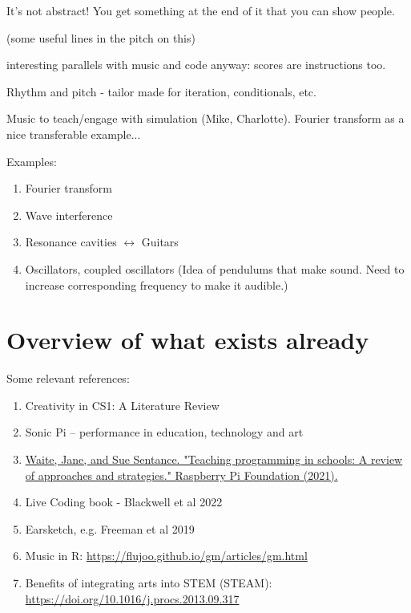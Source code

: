 It's not abstract! You get something at the end of it that you can show people.

(some useful lines in the pitch on this)

interesting parallels with music and code anyway: scores are instructions too.

Rhythm and pitch - tailor made for iteration, conditionals, etc.

Music to teach/engage with simulation (Mike, Charlotte). Fourier transform as a nice transferable example...

Examples:
\begin{enumerate}
    \item Fourier transform
    \item Wave interference
    \item Resonance cavities $\leftrightarrow{}$ Guitars
    \item Oscillators, coupled oscillators (Idea of pendulums that make sound. Need to increase corresponding frequency to make it audible.)
\end{enumerate}


\section{Overview of what exists already} \label{sec:literature}

Some relevant references:
\begin{enumerate}
\item Creativity in CS1: A Literature Review \cite{Sharmin2021}
\item Sonic Pi – performance in education, technology and art \cite{Aaron2016}
\item \href{https://www.raspberrypi.org/app/uploads/2021/11/Teaching-programming-in-schools-pedagogy-review-Raspberry-Pi-Foundation.pdf}{Waite, Jane, and Sue Sentance. "Teaching programming in schools: A review of approaches and strategies." Raspberry Pi Foundation (2021).}
\item Live Coding book - Blackwell et al 2022
\item Earsketch, e.g. Freeman et al 2019
\item Music in R: \href{https://flujoo.github.io/gm/articles/gm.html}{https://flujoo.github.io/gm/articles/gm.html}
\item Benefits of integrating arts into STEM (STEAM): \href{https://doi.org/10.1016/j.procs.2013.09.317}{https://doi.org/10.1016/j.procs.2013.09.317}
\end{enumerate}

